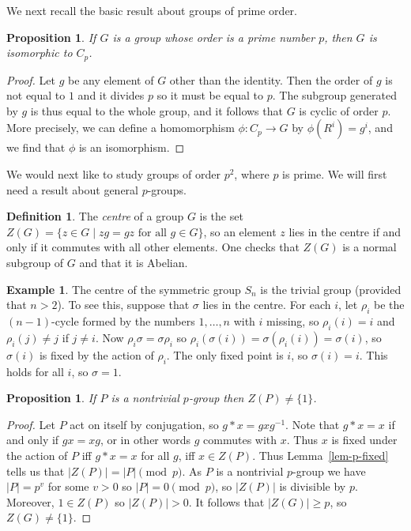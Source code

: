 \documentclass{amsart}
\newcommand{\st}        {\;|\;}
\newcommand{\xra}       {\xrightarrow}
\newcommand{\sg}        {\sigma}
\renewcommand{\:}{\colon}
\newtheorem{proposition}[theorem]{Proposition}
\theoremstyle{definition}
\newtheorem{definition}[theorem]{Definition}
\newtheorem{example}[theorem]{Example}
\begin{document}
We next recall the basic result about groups of prime order.
\begin{proposition}\label{prop-p}
 If $G$ is a group whose order is a prime number $p$, then $G$ is
 isomorphic to $C_p$.
\end{proposition}
\begin{proof}
 Let $g$ be any element of $G$ other than the identity.  Then the
 order of $g$ is not equal to $1$ and it divides $p$ so it must be
 equal to $p$.  The subgroup generated by $g$ is thus equal to the
 whole group, and it follows that $G$ is cyclic of order $p$.  More
 precisely, we can define a homomorphism $\phi\:C_p\xra{}G$ by
 $\phi(R^i)=g^i$, and we find that $\phi$ is an isomorphism.
\end{proof}

We would next like to study groups of order $p^2$, where $p$ is
prime.  We will first need a result about general $p$-groups.

\begin{definition}
 The \emph{centre} of a group $G$ is the set
 $Z(G)=\{z\in G\st zg=gz \text{ for all } g\in G\}$, so an element $z$
 lies in the centre if and only if it commutes with all other
 elements.  One checks that $Z(G)$ is a normal subgroup of $G$ and
 that it is Abelian.
\end{definition}

\begin{example}
 The centre of the symmetric group $S_n$ is the trivial group
 (provided that $n>2$).  To see this, suppose that $\sg$ lies in the
 centre.  For each $i$, let $\rho_i$ be the $(n-1)$-cycle formed by
 the numbers $1,\ldots,n$ with $i$ missing, so $\rho_i(i)=i$ and
 $\rho_i(j)\neq j$ if $j\neq i$.  Now $\rho_i\sg=\sg\rho_i$ so
 $\rho_i(\sg(i))=\sg(\rho_i(i))=\sg(i)$, so $\sg(i)$ is fixed by the
 action of $\rho_i$.  The only fixed point is $i$, so $\sg(i)=i$.
 This holds for all $i$, so $\sg=1$.
\end{example}

\begin{proposition}\label{prop-ZP}
 If $P$ is a nontrivial $p$-group then $Z(P)\neq\{1\}$.
\end{proposition}
\begin{proof}
 Let $P$ act on itself by conjugation, so $g*x=gxg^{-1}$.  Note that
 $g*x=x$ if and only if $gx=xg$, or in other words $g$ commutes with
 $x$.  Thus $x$ is fixed under the action of $P$ iff $g*x=x$ for all
 $g$, iff $x\in Z(P)$.  Thus Lemma~\ref{lem-p-fixed} tells us that
 $|Z(P)|=|P|\pmod{p}$.  As $P$ is a nontrivial $p$-group we have
 $|P|=p^v$ for some $v>0$ so $|P|=0\pmod{p}$, so $|Z(P)|$ is divisible
 by $p$.  Moreover, $1\in Z(P)$ so $|Z(P)|>0$.  It follows that
 $|Z(G)|\geq p$, so $Z(G)\neq\{1\}$.
\end{proof}
\end{document}
